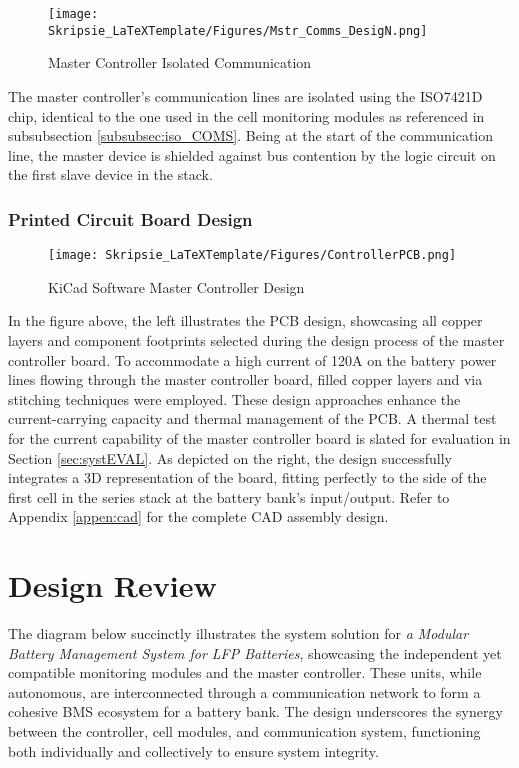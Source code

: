 \begin{figure}[h!]
\centering
\texttt{[image: Skripsie\_LaTeXTemplate/Figures/Mstr\_Comms\_DesigN.png]}
\caption{Master Controller Isolated Communication}
\label{fig:Mstr_D2}
\end{figure}
\noindent
The master controller's communication lines are isolated using the ISO7421D chip, identical to the one used in the cell monitoring modules as referenced in subsubsection \ref{subsubsec:iso_COMS}. Being at the start of the communication line, the master device is shielded against bus contention by the logic circuit on the first slave device in the stack.
\subsubsection{Printed Circuit Board Design}\label{subsec:mmmm6}
\begin{figure}[h!]
\centering
\texttt{[image: Skripsie\_LaTeXTemplate/Figures/ControllerPCB.png]}
\caption{KiCad Software Master Controller Design}
\label{fig:Master_Board_PCB_2D}
\end{figure}
\noindent
In the figure above, the left illustrates the PCB design, showcasing all copper layers and component footprints selected during the design process of the master controller board. To accommodate a high current of 120A on the battery power lines flowing through the master controller board, filled copper layers and via stitching techniques were employed. These design approaches enhance the current-carrying capacity and thermal management of the PCB. A thermal test for the current capability of the master controller board is slated for evaluation in Section \ref{sec:systEVAL}. As depicted on the right, the design successfully integrates a 3D representation of the board, fitting perfectly to the side of the first cell in the series stack at the battery bank's input/output. Refer to Appendix \ref{appen:cad} for the complete CAD assembly design.
\newpage
\section{Design Review}\label{subsec:Des_Review}
The diagram below succinctly illustrates the system solution for \emph{a Modular Battery Management System for LFP Batteries}, showcasing the independent yet compatible monitoring modules and the master controller. These units, while autonomous, are interconnected through a communication network to form a cohesive BMS ecosystem for a battery bank. The design underscores the synergy between the controller, cell modules, and communication system, functioning both individually and collectively to ensure system integrity.

